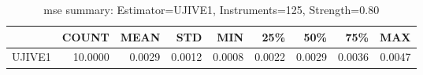 \begin{table}[ht]
\centering
\caption{mse summary: Estimator=UJIVE1, Instruments=125, Strength=0.80}
\begin{tabular}{lrrrrrrrr}
\toprule
 & COUNT & MEAN & STD & MIN & 25\% & 50\% & 75\% & MAX \\
\midrule
UJIVE1 & 10.0000 & 0.0029 & 0.0012 & 0.0008 & 0.0022 & 0.0029 & 0.0036 & 0.0047 \\
\bottomrule
\end{tabular}
\end{table}
